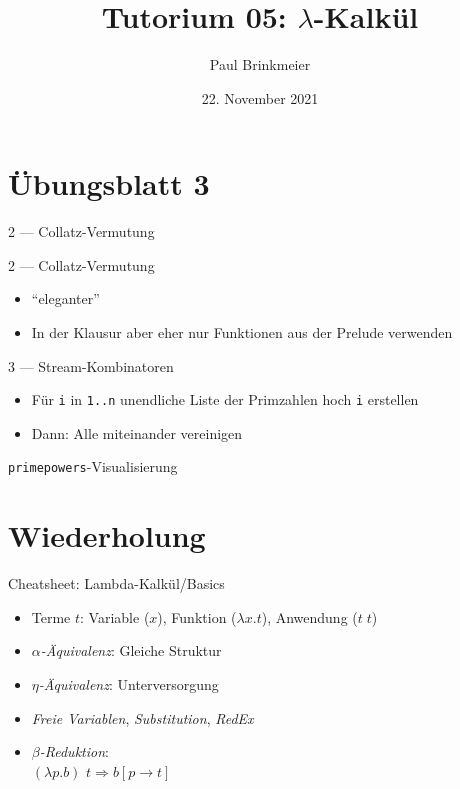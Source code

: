 \documentclass{beamer}
\title{Tutorium 05: $\lambda$-Kalkül}
\author{Paul Brinkmeier}
\institute{Tutorium Programmierparadigmen am KIT}
\date{22. November 2021}
\begin{document}
\begin{frame}
	\titlepage
\end{frame}

\section{Übungsblatt 3}

\begin{frame}{2 --- Collatz-Vermutung}
\end{frame}

\begin{frame}{2 --- Collatz-Vermutung}

	\begin{itemize}
		\item \enquote{eleganter}
		\item In der Klausur aber eher nur Funktionen aus der Prelude verwenden
	\end{itemize}
\end{frame}

\begin{frame}{3 --- Stream-Kombinatoren}

	\begin{itemize}
		\item Für \texttt{i} in \texttt{1..n} unendliche Liste der Primzahlen hoch \texttt{i} erstellen
		\item Dann: Alle miteinander vereinigen
	\end{itemize}
\end{frame}

\begin{frame}{\texttt{primepowers}-Visualisierung}
    
\end{frame}

\section{Wiederholung}

\begin{frame}{Cheatsheet: Lambda-Kalkül/Basics}
  \begin{itemize}
    \item Terme $t$: Variable ($x$), Funktion ($\lambda x . t$), Anwendung ($t \; t$)
    \item \emph{$\alpha$-Äquivalenz}: Gleiche Struktur
    \item \emph{$\eta$-Äquivalenz}: Unterversorgung
    \item \emph{Freie Variablen}, \emph{Substitution}, \emph{RedEx}
    \item \emph{$\beta$-Reduktion}: \\
          $(\lambda{}p.b)$ $t \Rightarrow b\left[p\rightarrow{}t\right]$
  \end{itemize}
\end{frame}
\end{document}
